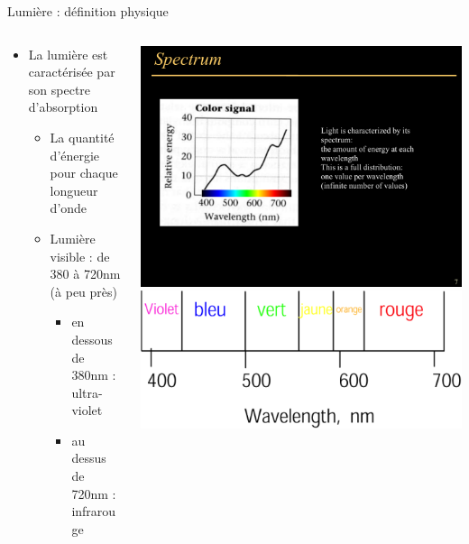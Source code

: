 \begin{frame}{Lumière : définition physique}
\begin{columns}
\begin{column}{.6\textwidth}
\begin{itemize}
\item La lumière est caractérisée par son spectre d'absorption
\begin{itemize}
\item La quantité d'énergie pour chaque longueur d'onde
\item Lumière visible : de 380 à 720nm (à peu près)
\begin{itemize}
\item en dessous de 380nm : ultra-violet
\item au dessus de 720nm : infrarouge
\end{itemize}
\end{itemize}
\end{itemize}
\end{column}
\begin{column}{.39\textwidth}
\includegraphics[width=.8\textwidth]{figs/spectre.pdf} \\
\vspace{1cm}
\includegraphics[width=.8\textwidth]{figs/lumsp.png} \\

\end{column}
\end{columns}
\end{frame}

